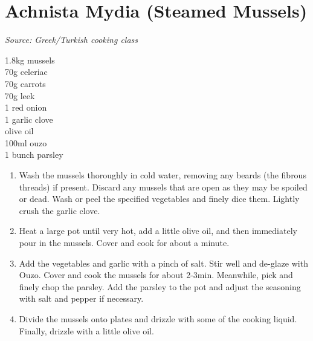 \documentclass{report}
\begin{document}
\section{Achnista Mydia (Steamed Mussels)}
\textit{Source: Greek/Turkish cooking class}\\
\begin{minipage}[t]{0.21\textwidth} \vspace{0pt} 
1.8kg mussels\\
70g celeriac \\
70g carrots \\
70g leek\\
1 red onion\\
1 garlic clove\\
olive oil \\
100ml ouzo \\
1 bunch parsley
\end{minipage}
\hfill
\begin{minipage}[t]{0.78\textwidth} \vspace{0pt}
	\begin{enumerate}
		\item Wash the mussels thoroughly in cold water, removing any beards (the fibrous threads) if present. Discard any mussels that are open as they may be spoiled or dead. Wash or peel the specified vegetables and finely dice them. Lightly crush the garlic clove.
   	 	\item Heat a large pot until very hot, add a little olive oil, and then immediately pour in the mussels. Cover and cook for about a minute.
    	\item Add the vegetables and garlic with a pinch of salt. Stir well and de-glaze with Ouzo. Cover and cook the mussels for about 2-3min. Meanwhile, pick and finely chop the parsley. Add the parsley to the pot and adjust the seasoning with salt and pepper if necessary.
    	\item Divide the mussels onto plates and drizzle with some of the cooking liquid. Finally, drizzle with a little olive oil.
	\end{enumerate}	
\end{minipage}
\end{document}
